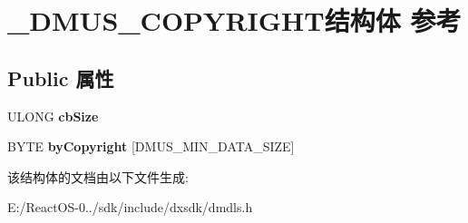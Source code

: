 \hypertarget{struct___d_m_u_s___c_o_p_y_r_i_g_h_t}{}\section{\+\_\+\+D\+M\+U\+S\+\_\+\+C\+O\+P\+Y\+R\+I\+G\+H\+T结构体 参考}
\label{struct___d_m_u_s___c_o_p_y_r_i_g_h_t}
\subsection*{Public 属性}
\begin{DoxyCompactItemize}
\item 
\mbox{\label{struct___d_m_u_s___c_o_p_y_r_i_g_h_t_ae2634e070240538aa16ac02318b4c3da}} 
U\+L\+O\+NG {\bfseries cb\+Size}
\item 
\mbox{\label{struct___d_m_u_s___c_o_p_y_r_i_g_h_t_a5a11ecbeee6c2c57a46c414c957d70ec}} 
B\+Y\+TE {\bfseries by\+Copyright} \mbox{[}D\+M\+U\+S\+\_\+\+M\+I\+N\+\_\+\+D\+A\+T\+A\+\_\+\+S\+I\+ZE\mbox{]}
\end{DoxyCompactItemize}


该结构体的文档由以下文件生成\+:\begin{DoxyCompactItemize}
\item 
E\+:/\+React\+O\+S-\/0../sdk/include/dxsdk/dmdls.\+h\end{DoxyCompactItemize}
